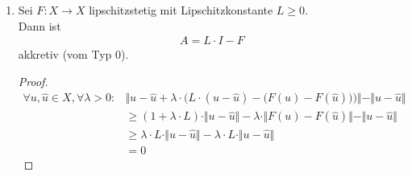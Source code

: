 \begin{beispiel}
\begin{enumerate}[label=(\alph*)]
\begin{proof}
\begin{align*}
				&\leq
				\sqrt{\int\limits_\Omega\Big|f\big(u(x)\big)-f(0)\Big|^2\d x}+|f(0)|\cdot\underbrace{|\Omega|}_{\text{Maß von }\Omega}\\
				&\leq
				L\cdot\Vert u\Vert_{L^2}+|f(0)|\cdot|\Omega|<\infty
			\end{align*}
		\end{proof}
		\item Sei $F:X\to X$ lipschitzstetig mit Lipschitzkonstante $L\geq0$.\\
		Dann ist 
		\begin{align*}
			A=L\cdot I-F
		\end{align*}
		akkretiv (vom Typ $0$).
		\begin{proof}
			\begin{align*}
				\forall u,\hat{u}\in X,\forall \lambda>0:
				&\bigg\Vert u-\hat{u}+\lambda\cdot\Big(L\cdot(u-\hat{u})-\big(F(u)-F(\hat{u})\big)\Big)\bigg\Vert-\Vert u-\hat{u}\Vert\\
				&\geq
				(1+\lambda\cdot L)\cdot\Vert u-\hat{u}\Vert-\lambda\cdot\Vert F(u)-F(\hat{u})\Vert-\Vert u-\hat{u}\Vert\\
				&\geq
				\lambda\cdot L\cdot\Vert u-\hat{u}\Vert-\lambda\cdot L\cdot\Vert u-\hat{u}\Vert\\
				&=0
			\end{align*}
		\end{proof}
	\end{enumerate}
\end{beispiel}

